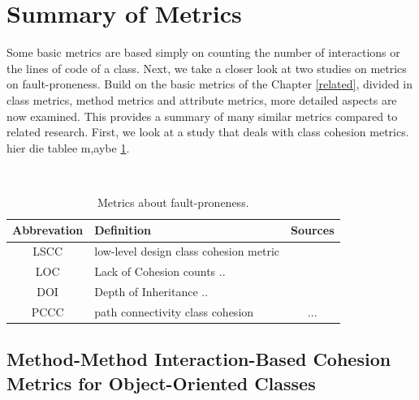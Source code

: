 \section{Summary of Metrics}\label{analysis}

Some basic metrics are based simply on counting the number of interactions or the lines of code of a class. Next, we take a closer look at two studies on metrics on fault-proneness. Build on the basic metrics of the Chapter \ref{related}, divided in class metrics, method metrics and attribute metrics, more detailed aspects are now examined. This provides a summary of many similar metrics compared to related research. First, we look at a study that deals with class cohesion metrics. hier die tablee m,aybe \ref{tab:metrics}.

\begin{table}
	\caption{Metrics about fault-proneness.}~\label{tab:metrics}
	
	\setlength\tabcolsep{3pt}
	\renewcommand{\arraystretch}{1.4}%
	\begin{tabularx}{\columnwidth}{ | c | p{5.8cm} || c | }
		\hline
		Abbrevation & Definition & Sources \\ \hline\hline
		LSCC & low-level design class cohesion metric & \cite{b3al2012fault} \\ \hline
		LOC & Lack of Cohesion counts ..  & \cite{b15chidamber1991towards} \\ \hline
		DOI & Depth of Inheritance .. & \cite{b15chidamber1991towards} \\ \hline
		PCCC & path connectivity class cohesion & ... \\ \hline
	\end{tabularx}
\end{table}


\subsection{Method-Method Interaction-Based Cohesion Metrics for Object-Oriented Classes}

